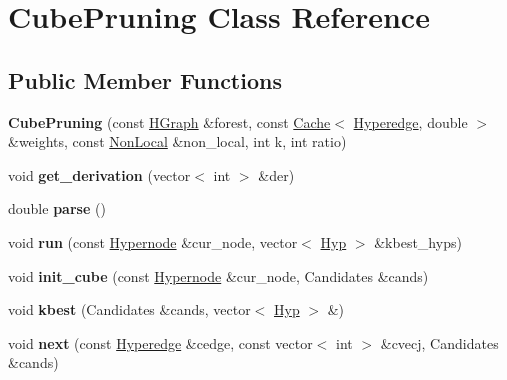 \hypertarget{classCubePruning}{
\section{CubePruning Class Reference}
\label{classCubePruning}
}
\subsection*{Public Member Functions}
\begin{DoxyCompactItemize}
\item 
\hypertarget{classCubePruning_af17d9dda17f79a2c44b47501b9d99870}{
{\bfseries CubePruning} (const \hyperlink{classScarab_1_1HG_1_1HGraph}{HGraph} \&forest, const \hyperlink{classCache}{Cache}$<$ \hyperlink{classScarab_1_1HG_1_1Hyperedge}{Hyperedge}, double $>$ \&weights, const \hyperlink{classNonLocal}{NonLocal} \&non\_\-local, int k, int ratio)}
\label{classCubePruning_af17d9dda17f79a2c44b47501b9d99870}

\item 
\hypertarget{classCubePruning_a0e8d07fc09d695095be5b70780db95d6}{
void {\bfseries get\_\-derivation} (vector$<$ int $>$ \&der)}
\label{classCubePruning_a0e8d07fc09d695095be5b70780db95d6}

\item 
\hypertarget{classCubePruning_adf80c0c689d075765f250649433833e4}{
double {\bfseries parse} ()}
\label{classCubePruning_adf80c0c689d075765f250649433833e4}

\item 
\hypertarget{classCubePruning_ab949710c0d8e552cbadbe837b1b62d47}{
void {\bfseries run} (const \hyperlink{classScarab_1_1HG_1_1Hypernode}{Hypernode} \&cur\_\-node, vector$<$ \hyperlink{structHyp}{Hyp} $>$ \&kbest\_\-hyps)}
\label{classCubePruning_ab949710c0d8e552cbadbe837b1b62d47}

\item 
\hypertarget{classCubePruning_a14a4e797c638d07744dc328cf2ce568e}{
void {\bfseries init\_\-cube} (const \hyperlink{classScarab_1_1HG_1_1Hypernode}{Hypernode} \&cur\_\-node, Candidates \&cands)}
\label{classCubePruning_a14a4e797c638d07744dc328cf2ce568e}

\item 
\hypertarget{classCubePruning_abe8c53bd14fe4ad98ff6388f38a849cb}{
void {\bfseries kbest} (Candidates \&cands, vector$<$ \hyperlink{structHyp}{Hyp} $>$ \&)}
\label{classCubePruning_abe8c53bd14fe4ad98ff6388f38a849cb}

\item 
\hypertarget{classCubePruning_a5d3ab59862953b9000154e9c07c69634}{
void {\bfseries next} (const \hyperlink{classScarab_1_1HG_1_1Hyperedge}{Hyperedge} \&cedge, const vector$<$ int $>$ \&cvecj, Candidates \&cands)}
\label{classCubePruning_a5d3ab59862953b9000154e9c07c69634}


\end{DoxyCompactItemize}
